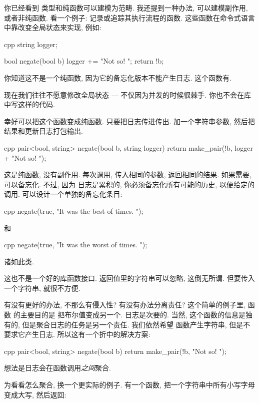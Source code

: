 
\lettrine[lhang=0.17]{你}{已经看到} 类型和纯函数可以建模为范畴. 我还提到一种办法, 可以建模副作用, 或者非纯函数.
看一个例子: 记录或追踪其执行流程的函数. 这些函数在命令式语言中靠改变全局状态来实现, 例如:

\begin{snip}{cpp}
string logger;

bool negate(bool b) {
    logger += "Not so! ";
    return !b;
}
\end{snip}
你知道这不是一个纯函数, 因为它的备忘化版本不能产生日志. 这个函数有.

现在我们往往不愿意修改全局状态 --- 不仅因为并发的时候很棘手. 你也不会在库中写这样的代码.

幸好可以把这个函数变成纯函数. 只要把日志传进传出. 加一个字符串参数, 然后把结果和更新日志打包输出.

\begin{snip}{cpp}
pair<bool, string> negate(bool b, string logger) {
    return make_pair(!b, logger + "Not so! ");
}
\end{snip}
这是纯函数, 没有副作用. 每次调用, 传入相同的参数, 返回相同的结果. 如果需要, 可以备忘化. 不过, 因为
日志是累积的, 你必须备忘化所有可能的历史, 以便给定的调用. 可以设计一个单独的备忘化条目:

\begin{snip}{cpp}
negate(true, "It was the best of times. ");
\end{snip}
和

\begin{snip}{cpp}
negate(true, "It was the worst of times. ");
\end{snip}
诸如此类.

这也不是一个好的库函数接口. 返回值里的字符串可以忽略, 这倒无所谓. 但要传入一个字符串, 就很不方便.

有没有更好的办法, 不那么有侵入性? 有没有办法分离责任? 这个简单的例子里, 函数  的主要目的是
把布尔值变成另一个. 日志是次要的. 当然, 这个函数的信息是独有的, 但是聚合日志的任务是另一个责任. 我们依然希望
函数产生字符串, 但是不要求它产生日志. 所以这有一个折中的解决方案:

\begin{snip}{cpp}
pair<bool, string> negate(bool b) {
    return make_pair(!b, "Not so! ");
}
\end{snip}
想法是日志会在函数调用\emph{之间}聚合.

为看看怎么聚合, 换一个更实际的例子. 有一个函数, 把一个字符串中所有小写字母变成大写, 然后返回:

